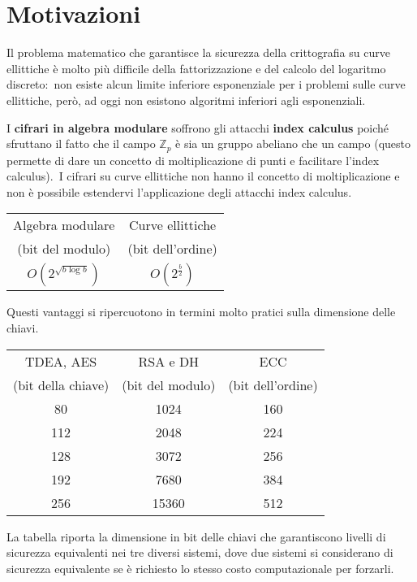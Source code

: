 \section{Motivazioni}

Il problema matematico che garantisce la sicurezza della crittografia su curve ellittiche è molto più difficile della fattorizzazione e del calcolo del logaritmo discreto:\ non esiste alcun limite inferiore esponenziale per i problemi sulle curve ellittiche, però, ad oggi non esistono algoritmi inferiori agli esponenziali.\

I \textbf{cifrari in algebra modulare} soffrono gli attacchi \textbf{index calculus} poiché sfruttano il fatto che il campo $\mathbb{Z}_p$ è sia un gruppo abeliano che un campo (questo permette di dare un concetto di moltiplicazione di punti e facilitare l'index calculus).\
I cifrari su curve ellittiche non hanno il concetto di moltiplicazione e non è possibile estendervi l'applicazione degli attacchi index calculus.\

\begin{table}[H]
    \centering
    \begin{tabular}{|c|c|}
        \hline
        Algebra modulare                   & Curve ellittiche                \\
        (bit del modulo)                   & (bit dell'ordine)               \\\hline
        $O\left(2^{\sqrt{b\log b}}\right)$ & $O\left(2^{\frac{b}{2}}\right)$ \\\hline
    \end{tabular}
\end{table}

\noindent Questi vantaggi si ripercuotono in termini molto pratici sulla dimensione delle chiavi.\


\begin{table}[H]
    \centering
    \begin{tabular}{|c|c|c|}
        \hline
        TDEA, AES          & RSA e DH         & ECC               \\
        (bit della chiave) & (bit del modulo) & (bit dell'ordine) \\\hline
        80                 & 1024             & 160               \\
        112                & 2048             & 224               \\
        128                & 3072             & 256               \\
        192                & 7680             & 384               \\
        256                & 15360            & 512               \\\hline
    \end{tabular}
\end{table}

\noindent La tabella riporta la dimensione in bit delle chiavi che garantiscono livelli di sicurezza equivalenti nei tre diversi sistemi, dove due sistemi si considerano di sicurezza equivalente se è richiesto lo stesso costo computazionale per forzarli.\

